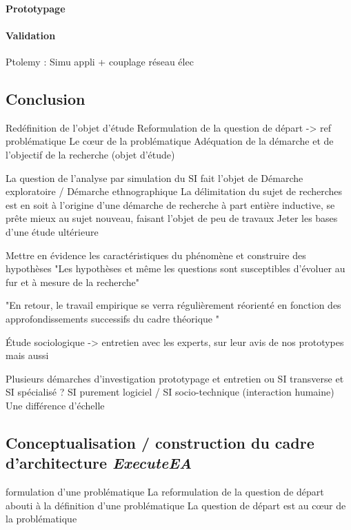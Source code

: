 			\paragraph{Prototypage}
		
			\paragraph{Validation}
	Ptolemy : Simu appli + couplage réseau élec
	
	
	\subsection{Conclusion}
Redéfinition de l'objet d'étude
Reformulation de la question de départ -> ref problématique 
Le cœur de la problématique 
Adéquation de la démarche et de l'objectif de la recherche (objet d'étude)
	
La question de l'analyse par simulation du SI fait l'objet de 
Démarche exploratoire / Démarche ethnographique 
La délimitation du sujet de recherches est en soit à l'origine d'une démarche de 
recherche à part entière  inductive, se prête mieux au sujet nouveau, faisant 
l'objet de peu de travaux
Jeter les bases d'une étude ultérieure


Mettre en évidence les caractéristiques du phénomène et construire des 
hypothèses 
"Les hypothèses et même les questions sont susceptibles d'évoluer au fur et à 
mesure de la recherche"

"En retour, le travail empirique se verra régulièrement réorienté en fonction 
des approfondissements successifs du cadre théorique "

Étude sociologique -> entretien avec les experts, sur leur avis de nos 
prototypes mais aussi 

Plusieurs démarches d'investigation 
prototypage et entretien 
ou SI transverse et SI spécialisé ? SI purement logiciel / SI socio-technique 
(interaction humaine) 
Une différence d'échelle 
		 


	\subsection{Conceptualisation / construction du cadre d'architecture 
\textit{ExecuteEA}}
formulation d'une problématique 
La reformulation de la question de départ abouti à la définition d'une 
problématique 
La question de départ est au cœur de la problématique 

